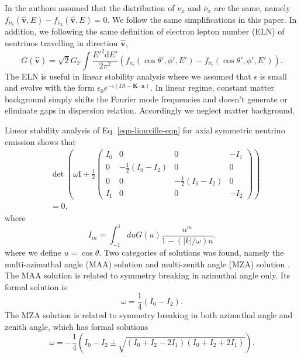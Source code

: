 \documentclass[%
preprint,
 amsmath,amssymb,
 aps,
 prd
]{revtex4-1}
\begin{document}
In  the authors assumed that the distribution of $\nu_x$ and $\bar\nu_x$ are the same, namely $ f_{\nu_{\mathrm x}}(\hat{\mathbf v},E)  - f_{\bar\nu_{\mathrm x}}(\hat{\mathbf v},E)=0$. We follow the same simplifications in this paper. In addition, we following the same definition of electron lepton number (ELN) of neutrinos travelling in direction $\hat{\mathbf v}$,
\begin{equation}
G(\hat{\mathbf v}) =  \sqrt{2}G_{\mathrm F} \int \frac{E'^2 \mathrm d E'}{2\pi^2} ( f_{\nu_{\mathrm e}}(\cos\theta',\phi',E')  - f_{\bar\nu_{\mathrm e}}(\cos\theta',\phi',E')  ).
\end{equation}
The ELN is useful in linear stability analysis where we assumed that $\epsilon$ is small and evolve with the form $\epsilon_0 e^{-i(\Omega t - \mathbf K\cdot \mathbf x)}$. In linear regime, constant matter background simply shifts the Fourier mode frequencies and doesn't generate or eliminate gaps in dispersion relation. Accordingly we neglect matter background.

Linear stability analysis of Eq. \eqref{eqn-liouville-eqn} for axial symmetric neutrino emission shows that
\begin{align}
&\det \left( \omega \mathrm{I} + \frac{1}{2}
\begin{pmatrix}
   I_0 & 0 & 0 & -I_1 \\
   0 & -\frac{1}{2} (I_0 - I_2) & 0 & 0 \\
   0 & 0 & -\frac{1}{2} (I_0 - I_2) & 0 \\
   I_1 & 0 & 0 & -I_2
\end{pmatrix}\right) \nonumber\\
&=0,
\label{eqn-det-polarization-tensor}
\end{align}
where
\begin{equation}
   I_m =\int_{-1}^{1} d u G(u) \frac{u^m}{1 -  \left(\lvert k\rvert /\omega\right) u }.
\end{equation}
where we define $u=\cos\theta$. Two categories of solutions was found, namely the multi-azimuthal angle (MAA) solution and multi-zenith angle (MZA) solution \cite{Raffelt2013}. The MAA solution is related to symmetry breaking in azimuthal angle only. Its formal solution is
\begin{equation}
   \omega = \frac{1}{4}(I_0 - I_2).
   \label{eqn-maa}
\end{equation}
The MZA solution is related to symmetry breaking in both azimuthal angle and zenith angle, which has formal solutions
\begin{equation}
\omega = - \frac{1}{4} \left( I_0 - I_2 \pm \sqrt{ (I_0 + I_2 - 2 I_1) (I_0 + I_2 + 2 I_1) } \right).
\label{eqn-mza}
\end{equation}
\end{document}
